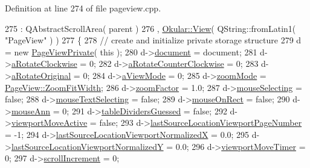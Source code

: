 Definition at line 274 of file pageview.\+cpp.


\begin{DoxyCode}
275     : QAbstractScrollArea( parent )
276     , \hyperlink{classOkular_1_1View}{Okular::View}( QString::fromLatin1( \textcolor{stringliteral}{"PageView"} ) )
277 \{
278     \textcolor{comment}{// create and initialize private storage structure}
279     d = \textcolor{keyword}{new} \hyperlink{classPageViewPrivate}{PageViewPrivate}( \textcolor{keyword}{this} );
280     d->\hyperlink{classPageViewPrivate_a50645b9853306cffd74e51efb677e5b4}{document} = document;
281     d->\hyperlink{classPageViewPrivate_a389103a18e7590c8ec75c26e23806e51}{aRotateClockwise} = 0;
282     d->\hyperlink{classPageViewPrivate_a4a8b7b626080698fa1dbf78d60cbff59}{aRotateCounterClockwise} = 0;
283     d->\hyperlink{classPageViewPrivate_ae57bd1f37889d8a28535e877c2fa87ed}{aRotateOriginal} = 0;
284     d->\hyperlink{classPageViewPrivate_a89d998dea21b24010b2578c6b4f5d9d2}{aViewMode} = 0;
285     d->\hyperlink{classPageViewPrivate_a009f59f9f081ced030a81a8ca726c2b2}{zoomMode} = \hyperlink{classPageView_af489dc2492677bb4f422660627f62aeca37b37e7554b8276eabe7310a11263664}{PageView::ZoomFitWidth};
286     d->\hyperlink{classPageViewPrivate_a938411ef880f839b765aeac48a482b9e}{zoomFactor} = 1.0;
287     d->\hyperlink{classPageViewPrivate_a8819b152a8279b75359af2a3e0567681}{mouseSelecting} = \textcolor{keyword}{false};
288     d->\hyperlink{classPageViewPrivate_a64e9f3610cf2b731a3c0c4eae976e687}{mouseTextSelecting} = \textcolor{keyword}{false};
289     d->\hyperlink{classPageViewPrivate_af6568bdd2ef97bb2c81a71961923ee4d}{mouseOnRect} = \textcolor{keyword}{false};
290     d->\hyperlink{classPageViewPrivate_ac92373de9a9cb5f2085b186a7e321a3b}{mouseAnn} = 0;
291     d->\hyperlink{classPageViewPrivate_a2ceb798d9b9f218e6acc3769d01102f4}{tableDividersGuessed} = \textcolor{keyword}{false};
292     d->\hyperlink{classPageViewPrivate_acc47dfc95cad4f126c4dbd3e8f31e43b}{viewportMoveActive} = \textcolor{keyword}{false};
293     d->\hyperlink{classPageViewPrivate_a12f794c9556da941d62030f41e37ea87}{lastSourceLocationViewportPageNumber} = -1;
294     d->\hyperlink{classPageViewPrivate_ada1e593e53f5fe775184f97ec3b1bbc7}{lastSourceLocationViewportNormalizedX} = 0.0;
295     d->\hyperlink{classPageViewPrivate_af9fd59edb9afe621534cfb8086fc95ab}{lastSourceLocationViewportNormalizedY} = 0.0;
296     d->\hyperlink{classPageViewPrivate_aa64146b7eacddc342bbdded26dc08c6a}{viewportMoveTimer} = 0;
297     d->\hyperlink{classPageViewPrivate_a514156a25a5fc564a7ddabe5d30bcecb}{scrollIncrement} = 0;

\end{DoxyCode}
